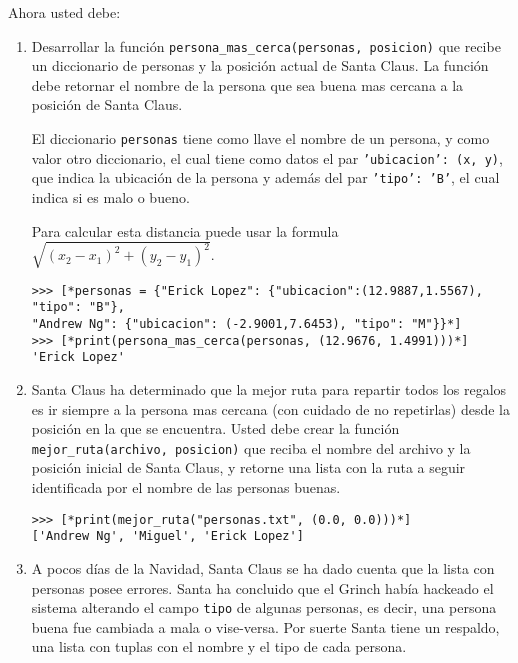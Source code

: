 Ahora usted debe:
\begin{enumerate}

\item Desarrollar la función \texttt{persona\_mas\_cerca(personas, posicion)} que recibe un diccionario de personas y la posición actual de Santa Claus. La función debe retornar el nombre de la persona que sea buena mas cercana a la posición de Santa Claus. 

El diccionario \texttt{personas} tiene como llave el nombre de un persona, y como valor otro diccionario, el cual tiene como datos el par \texttt{'ubicacion': (x, y)}, que indica la ubicación de la persona y además del par \texttt{'tipo': 'B'}, el cual indica si es malo o bueno.
    
Para calcular esta distancia puede usar la formula $\sqrt{(x_2 - x_1)^2 + (y_2 - y_1)^2 }$.
    
\begin{lstlisting}[style=consola]
>>> [*personas = {"Erick Lopez": {"ubicacion":(12.9887,1.5567), "tipo": "B"}, 
"Andrew Ng": {"ubicacion": (-2.9001,7.6453), "tipo": "M"}}*]
>>> [*print(persona_mas_cerca(personas, (12.9676, 1.4991)))*]
'Erick Lopez'
\end{lstlisting}

\item Santa Claus ha determinado que la mejor ruta para repartir todos los regalos es ir siempre a la persona mas cercana (con cuidado de no repetirlas) desde la posición en la que se encuentra. Usted debe crear la función \texttt{mejor\_ruta(archivo, posicion)} que reciba el nombre del archivo y la posición inicial de Santa Claus, y retorne una lista con la ruta a seguir identificada por el nombre
de las personas buenas.


\begin{lstlisting}[style=consola]
>>> [*print(mejor_ruta("personas.txt", (0.0, 0.0)))*]
['Andrew Ng', 'Miguel', 'Erick Lopez']
\end{lstlisting}

\item A pocos días de la Navidad, Santa Claus se ha dado cuenta que la lista con personas posee
errores. Santa ha concluido que el Grinch había hackeado el sistema alterando el campo \texttt{tipo} de
algunas personas, es decir, una persona buena fue cambiada a mala o vise-versa. Por suerte Santa
tiene un respaldo, una lista con tuplas con el nombre y el tipo de cada persona. 


\end{enumerate}
